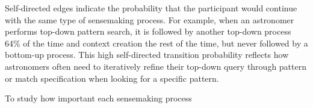  Self-directed edges indicate the probability that the participant
 would continue with the same type of sensemaking process.
 For example, when an astronomer performs top-down pattern search,
 it is followed by another top-down process 64\% of the time and context creation the rest of the time,
 but never followed by a bottom-up process.
 This high self-directed transition probability
 reflects how astronomers often need to iteratively
 refine their top-down query through pattern
 or match specification when looking for a specific pattern. %
 \par To study how important each sensemaking process
